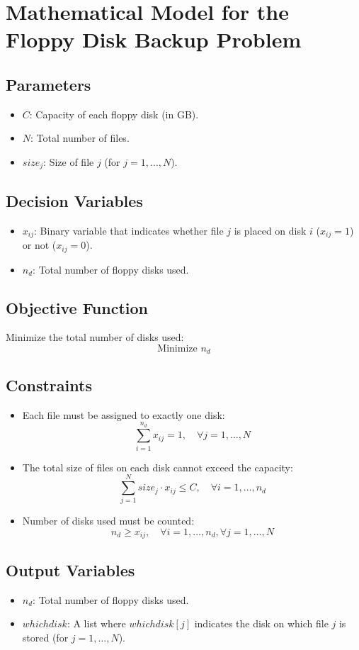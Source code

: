 \documentclass{article}
\begin{document}
\section*{Mathematical Model for the Floppy Disk Backup Problem}

\subsection*{Parameters}
\begin{itemize}
    \item $C$: Capacity of each floppy disk (in GB).
    \item $N$: Total number of files.
    \item $size_{j}$: Size of file $j$ (for $j = 1, \ldots, N$).
\end{itemize}

\subsection*{Decision Variables}
\begin{itemize}
    \item $x_{ij}$: Binary variable that indicates whether file $j$ is placed on disk $i$ ($x_{ij} = 1$) or not ($x_{ij} = 0$).
    \item $n_{d}$: Total number of floppy disks used.
\end{itemize}

\subsection*{Objective Function}
Minimize the total number of disks used:
\[
\text{Minimize } n_{d}
\]

\subsection*{Constraints}
\begin{itemize}
    \item Each file must be assigned to exactly one disk:
    \[
    \sum_{i=1}^{n_{d}} x_{ij} = 1, \quad \forall j = 1, \ldots, N
    \]
    
    \item The total size of files on each disk cannot exceed the capacity:
    \[
    \sum_{j=1}^{N} size_{j} \cdot x_{ij} \leq C, \quad \forall i = 1, \ldots, n_{d}
    \]

    \item Number of disks used must be counted:
    \[
    n_{d} \geq x_{ij}, \quad \forall i = 1, \ldots, n_{d}, \forall j = 1, \ldots, N
    \]
\end{itemize}

\subsection*{Output Variables}
\begin{itemize}
    \item $n_{d}$: Total number of floppy disks used.
    \item $whichdisk$: A list where $whichdisk[j]$ indicates the disk on which file $j$ is stored (for $j = 1, \ldots, N$).
\end{itemize}
\end{document}
